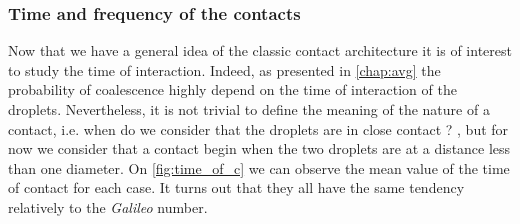 \subsubsection{Time and frequency of the contacts}
Now that we have a general idea of the classic contact architecture it is of interest to study the time of interaction. 
Indeed, as presented in \ref{chap:avg} the probability of coalescence highly depend on the time of interaction of the droplets. 
Nevertheless, it is not trivial to define the meaning of the nature of a contact, i.e. when do we consider that the droplets are in close contact ?
, but for now we consider that a contact begin when the two droplets are at a distance less than one diameter. 
On \ref{fig:time_of_c} we can observe the mean value of the time of contact for each case.
It turns out that they all have the same tendency relatively to the \textit{Galileo} number. 
